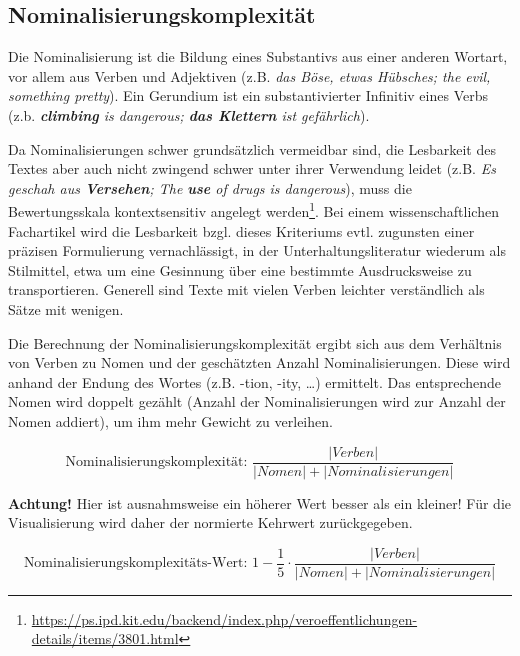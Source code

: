 \documentclass[10pt,a4paper]{article}
\begin{document}
	\subsection*{Nominalisierungskomplexität}
	Die Nominalisierung ist die Bildung eines Substantivs aus einer anderen Wortart, vor allem aus Verben und Adjektiven (z.B. \textit{das Böse, etwas Hübsches; the evil, something pretty}). Ein Gerundium ist ein substantivierter Infinitiv eines Verbs (z.b. \textit{\textbf{climbing} is dangerous; \textbf{das Klettern} ist gefährlich}).
	
	Da Nominalisierungen schwer grundsätzlich vermeidbar sind, die Lesbarkeit des Textes aber auch nicht zwingend schwer unter ihrer Verwendung leidet (z.B. \textit{Es geschah aus \textbf{Versehen}; The \textbf{use} of drugs is dangerous}), muss die Bewertungsskala kontextsensitiv angelegt werden\footnote{\url{https://ps.ipd.kit.edu/backend/index.php/veroeffentlichungen-details/items/3801.html}}. Bei einem wissenschaftlichen Fachartikel wird die Lesbarkeit bzgl. dieses Kriteriums evtl. zugunsten einer präzisen Formulierung vernachlässigt, in der Unterhaltungsliteratur wiederum als Stilmittel, etwa um eine Gesinnung über eine bestimmte Ausdrucksweise zu transportieren. Generell sind Texte mit vielen Verben leichter verständlich als Sätze mit wenigen.
	
	Die Berechnung der Nominalisierungskomplexität ergibt sich aus dem Verhältnis von Verben zu Nomen und der geschätzten Anzahl Nominalisierungen. Diese wird anhand der Endung des Wortes (z.B. -tion, -ity, \dots) ermittelt. Das entsprechende Nomen wird doppelt gezählt (Anzahl der Nominalisierungen wird zur Anzahl der Nomen addiert), um ihm mehr Gewicht zu verleihen.
	
	\begin{equation*}
		\text{Nominalisierungskomplexität: }\frac{|Verben|}{|Nomen|+|Nominalisierungen|}
	\end{equation*}
	
	\textbf{Achtung!} Hier ist ausnahmsweise ein höherer Wert besser als ein kleiner! Für die Visualisierung wird daher der normierte Kehrwert zurückgegeben.
	
	\begin{equation*}
	\text{Nominalisierungskomplexitäts-Wert: } 1-\frac{1}{5}\cdot\frac{|Verben|}{|Nomen|+|Nominalisierungen|}
	\end{equation*}
		
	
\end{document}
